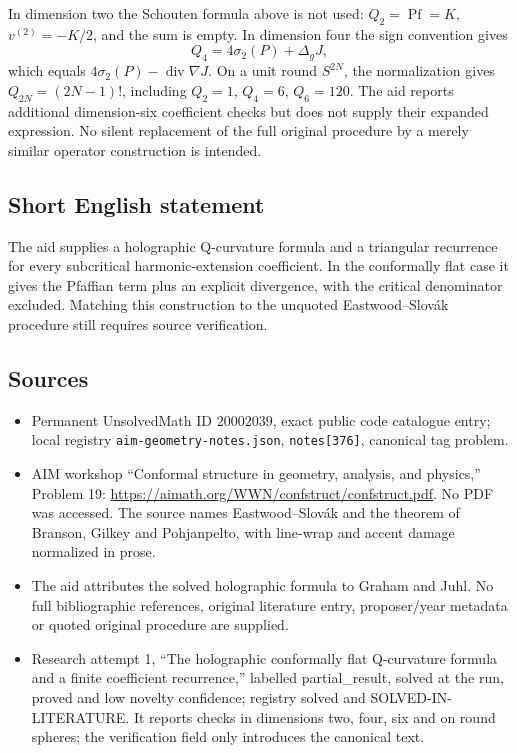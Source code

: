 \documentclass[11pt]{article}
\begin{document}
In dimension two the Schouten formula above is not used: \(Q_2=\operatorname{Pf}=K\), \(v^{(2)}=-K/2\), and the sum is empty. In dimension four the sign convention gives
\[
 Q_4=4\sigma_2(P)+\Delta_gJ,
\]
which equals \(4\sigma_2(P)-\operatorname{div}\nabla J\). On a unit round \(S^{2N}\), the normalization gives \(Q_{2N}=(2N-1)!\), including \(Q_2=1\), \(Q_4=6\), \(Q_6=120\). The aid reports additional dimension-six coefficient checks but does not supply their expanded expression. No silent replacement of the full original procedure by a merely similar operator construction is intended.
\subsection{Short English statement}
The aid supplies a holographic Q-curvature formula and a triangular recurrence for every subcritical harmonic-extension coefficient. In the conformally flat case it gives the Pfaffian term plus an explicit divergence, with the critical denominator excluded. Matching this construction to the unquoted Eastwood--Slovák procedure still requires source verification.
\subsection{Sources}
\begin{itemize}
\item Permanent UnsolvedMath ID \(20002039\), exact public code catalogue entry; local registry \texttt{aim-geometry-notes.json}, \texttt{notes[376]}, canonical tag problem.
\item AIM workshop ``Conformal structure in geometry, analysis, and physics,'' Problem 19: \url{https://aimath.org/WWN/confstruct/confstruct.pdf}. No PDF was accessed. The source names Eastwood--Slovák and the theorem of Branson, Gilkey and Pohjanpelto, with line-wrap and accent damage normalized in prose.
\item The aid attributes the solved holographic formula to Graham and Juhl. No full bibliographic references, original literature entry, proposer/year metadata or quoted original procedure are supplied.
\item Research attempt 1, ``The holographic conformally flat Q-curvature formula and a finite coefficient recurrence,'' labelled partial\_result, solved at the run, proved and low novelty confidence; registry solved and SOLVED-IN-LITERATURE. It reports checks in dimensions two, four, six and on round spheres; the verification field only introduces the canonical text.
\end{itemize}
\end{document}
